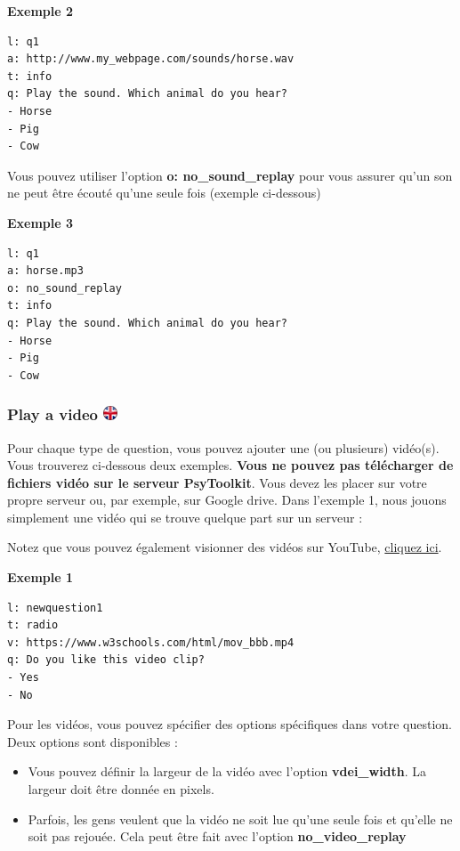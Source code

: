 \documentclass[
]{book}
\providecommand{\tightlist}{%
  \setlength{\itemsep}{0pt}\setlength{\parskip}{0pt}}
\begin{document}
\textbf{Exemple 2}

\begin{verbatim}
l: q1
a: http://www.my_webpage.com/sounds/horse.wav
t: info
q: Play the sound. Which animal do you hear?
- Horse
- Pig
- Cow
\end{verbatim}

Vous pouvez utiliser l'option \textbf{o: no\_sound\_replay} pour vous
assurer qu'un son ne peut être écouté qu'une seule fois (exemple
ci-dessous)

\textbf{Exemple 3}

\begin{verbatim}
l: q1
a: horse.mp3
o: no_sound_replay
t: info
q: Play the sound. Which animal do you hear?
- Horse
- Pig
- Cow
\end{verbatim}

\hypertarget{play-a-video}{%
\subsubsection[Play a video ]{\texorpdfstring{Play a video
\href{https://www.psytoolkit.org/doc3.1.0/online-survey-syntax.html\#video}{\protect\includegraphics{img/ukflag.png}}}{Play a video }}\label{play-a-video}}

Pour chaque type de question, vous pouvez ajouter une (ou plusieurs)
vidéo(s). Vous trouverez ci-dessous deux exemples. \textbf{Vous ne
pouvez pas télécharger de fichiers vidéo sur le serveur PsyToolkit}.
Vous devez les placer sur votre propre serveur ou, par exemple, sur
Google drive. Dans l'exemple 1, nous jouons simplement une vidéo qui se
trouve quelque part sur un serveur :

Notez que vous pouvez également visionner des vidéos sur YouTube,
\protect\hyperlink{Youtube}{cliquez ici}.

\textbf{Exemple 1}

\begin{verbatim}
l: newquestion1
t: radio
v: https://www.w3schools.com/html/mov_bbb.mp4
q: Do you like this video clip?
- Yes
- No
\end{verbatim}

Pour les vidéos, vous pouvez spécifier des options spécifiques dans
votre question. Deux options sont disponibles :

\begin{itemize}
\tightlist
\item
  Vous pouvez définir la largeur de la vidéo avec l'option
  \textbf{vdei\_width}. La largeur doit être donnée en pixels.
\item
  Parfois, les gens veulent que la vidéo ne soit lue qu'une seule fois
  et qu'elle ne soit pas rejouée. Cela peut être fait avec l'option
  \textbf{no\_video\_replay}
\end{itemize}
\end{document}
